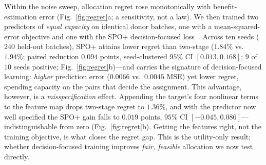 \documentclass[journal]{IEEEtran}
\begin{document}
Within the noise sweep, allocation regret rose monotonically with benefit-estimation error (Fig.~\ref{fig:regret}a; a sensitivity, not a law). We then trained two predictors of \emph{equal capacity} on identical donor batches, one with a mean-squared-error objective and one with the SPO+ decision-focused loss~\cite{spo}. Across ten seeds ($240$ held-out batches), SPO+ attains lower regret than two-stage ($1.84\%$ vs.\ $1.94\%$; paired reduction $0.094$ points, seed-clustered $95\%$ CI $[0.013,0.168]$; $9$ of $10$ seeds positive; Fig.~\ref{fig:regret}b)---and carries the signature of decision-focused learning: \emph{higher} prediction error ($0.0066$ vs.\ $0.0045$ MSE) yet lower regret, spending capacity on the pairs that decide the assignment. This advantage, however, is a \emph{misspecification} effect. Appending the target's four nonlinear terms to the feature map drops two-stage regret to $1.36\%$, and with the predictor now well specified the SPO+ gain falls to $0.019$ points, $95\%$ CI $[-0.045,0.086]$---indistinguishable from zero (Fig.~\ref{fig:regret}b). Getting the features right, not the training objective, is what closes the regret gap. This is the utility-only result; whether decision-focused training improves \emph{fair, feasible} allocation we now test directly.
\end{document}
